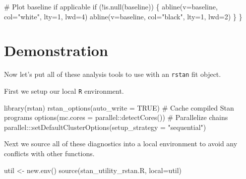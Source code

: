 \documentclass[
  letterpaper,
  DIV=11,
  numbers=noendperiod]{scrartcl}
\newenvironment{Shaded}{\begin{snugshade}}{\end{snugshade}}
\newcommand{\AttributeTok}[1]{\textcolor[rgb]{0.40,0.45,0.13}{#1}}
\newcommand{\CommentTok}[1]{\textcolor[rgb]{0.37,0.37,0.37}{#1}}
\newcommand{\ConstantTok}[1]{\textcolor[rgb]{0.56,0.35,0.01}{#1}}
\newcommand{\ControlFlowTok}[1]{\textcolor[rgb]{0.00,0.23,0.31}{#1}}
\newcommand{\DecValTok}[1]{\textcolor[rgb]{0.68,0.00,0.00}{#1}}
\newcommand{\FunctionTok}[1]{\textcolor[rgb]{0.28,0.35,0.67}{#1}}
\newcommand{\NormalTok}[1]{\textcolor[rgb]{0.00,0.23,0.31}{#1}}
\newcommand{\OtherTok}[1]{\textcolor[rgb]{0.00,0.23,0.31}{#1}}
\newcommand{\SpecialCharTok}[1]{\textcolor[rgb]{0.37,0.37,0.37}{#1}}
\newcommand{\StringTok}[1]{\textcolor[rgb]{0.13,0.47,0.30}{#1}}
\begin{document}
\begin{Shaded}
\begin{Highlighting}[]
  \CommentTok{\# Plot baseline if applicable}
  \ControlFlowTok{if}\NormalTok{ (}\SpecialCharTok{!}\FunctionTok{is.null}\NormalTok{(baseline)) \{}
    \FunctionTok{abline}\NormalTok{(}\AttributeTok{v=}\NormalTok{baseline, }\AttributeTok{col=}\StringTok{"white"}\NormalTok{, }\AttributeTok{lty=}\DecValTok{1}\NormalTok{, }\AttributeTok{lwd=}\DecValTok{4}\NormalTok{)}
    \FunctionTok{abline}\NormalTok{(}\AttributeTok{v=}\NormalTok{baseline, }\AttributeTok{col=}\StringTok{"black"}\NormalTok{, }\AttributeTok{lty=}\DecValTok{1}\NormalTok{, }\AttributeTok{lwd=}\DecValTok{2}\NormalTok{)}
\NormalTok{  \}}
\NormalTok{\}}
\end{Highlighting}
\end{Shaded}

\hypertarget{demonstration}{%
\section{Demonstration}\label{demonstration}}

Now let's put all of these analysis tools to use with an \texttt{rstan}
fit object.

First we setup our local \texttt{R} environment.

\begin{Shaded}
\begin{Highlighting}[]
\FunctionTok{library}\NormalTok{(rstan)}
\FunctionTok{rstan\_options}\NormalTok{(}\AttributeTok{auto\_write =} \ConstantTok{TRUE}\NormalTok{)            }\CommentTok{\# Cache compiled Stan programs}
\FunctionTok{options}\NormalTok{(}\AttributeTok{mc.cores =}\NormalTok{ parallel}\SpecialCharTok{::}\FunctionTok{detectCores}\NormalTok{()) }\CommentTok{\# Parallelize chains}
\NormalTok{parallel}\SpecialCharTok{:::}\FunctionTok{setDefaultClusterOptions}\NormalTok{(}\AttributeTok{setup\_strategy =} \StringTok{"sequential"}\NormalTok{)}
\end{Highlighting}
\end{Shaded}

Next we source all of these diagnostics into a local environment to
avoid any conflicts with other functions.

\begin{Shaded}
\begin{Highlighting}[]
\NormalTok{util }\OtherTok{\textless{}{-}} \FunctionTok{new.env}\NormalTok{()}
\FunctionTok{source}\NormalTok{(}\StringTok{\textquotesingle{}stan\_utility\_rstan.R\textquotesingle{}}\NormalTok{, }\AttributeTok{local=}\NormalTok{util)}
\end{Highlighting}
\end{Shaded}
\end{document}
